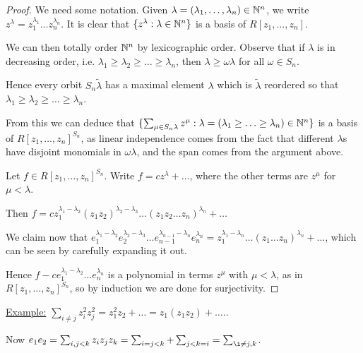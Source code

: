 \documentclass[a4paper, 10pt, twocolumn]{amsart}
\begin{document}
\begin{proof}
We need some notation. Given $\lambda = (\lambda_1, \ldots, \lambda_n) \in \mathbb{N}^n$, we write $z^{\lambda} = z_1^{\lambda_1}\ldots z_n^{\lambda_n}$. It is clear that $\{z^{\lambda} : \lambda \in \mathbb{N}^n\}$ is a basis of $R[z_1, \ldots, z_n]$.

We can then totally order $\mathbb{N}^n$ by lexicographic order. Observe that if $\lambda$ is in decreasing order, i.e. $\lambda_1 \geq \lambda_2 \geq \ldots \geq \lambda_n$, then $\lambda \geq \omega \lambda$ for all $\omega \in S_n$.

Hence every orbit $S_n \tilde{\lambda}$ has a maximal element $\lambda$ which is $\tilde{\lambda}$ reordered so that $\lambda_1 \geq \lambda_2 \geq \ldots \geq \lambda_n$.

From this we can deduce that $\{\sum_{\mu \in S_n \lambda} z^{\mu} : \lambda = (\lambda_1 \geq \ldots \geq \lambda_n) \in \mathbb{N}^n\}$ is a basis of $R[z_1, \ldots, z_n]^{S_n}$, as linear independence comes from the fact that different $\lambda$s have disjoint monomials in $\omega\lambda$, and the span comes from the argument above.

Let $f \in R[z_1, \ldots, z_n]^{S_n}$. Write $f = cz^{\lambda} + \ldots$, where the other terms are $z^{\mu}$ for $\mu < \lambda$.

Then $f = cz_1^{\lambda_1-\lambda_2}(z_1z_2)^{\lambda_2-\lambda_3}\ldots(z_1z_2 \ldots z_n)^{\lambda_n} + \ldots$

We claim now that $e_1^{\lambda_1-\lambda_2}e_2^{\lambda_2-\lambda_3}\ldots e_{n-1}^{\lambda_{n-1}-\lambda_n} e_n^{\lambda_n} = z_1^{\lambda_1-\lambda_n}\ldots (z_1\ldots z_n)^{\lambda_n} + \ldots$, which can be seen by carefully expanding it out.

Hence $f-ce_1^{\lambda_1 - \lambda_2}\ldots e_n^{\lambda_n}$ is a polynomial in terms $z^{\mu}$ with $\mu < \lambda$, as in $R[z_1, \ldots, z_n]^{S_n}$, so by induction we are done for surjectivity.
\end{proof}

\underline{Example:} $\sum_{i\neq j} z_i^2 z_j^2 = z_1^2 z_2 + \ldots = z_1(z_1z_2) + \ldots.$.

Now $e_1e_2 = \sum_{i, j<k} z_iz_jz_k = \sum_{i=j<k} +\sum_{j<k=i} = \sum_{\i\neq j, k}$.
\end{document}
